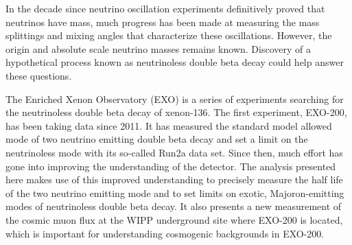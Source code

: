 In the decade since neutrino oscillation experiments definitively proved that neutrinos have mass, much progress has been made at measuring the mass splittings and mixing angles that characterize these oscillations. However, the origin and absolute scale neutrino masses remains known. Discovery of a hypothetical process known as neutrinoless double beta decay could help answer these questions.

The Enriched Xenon Observatory (EXO) is a series of experiments searching for the neutrinoless double beta decay of xenon-136. The first experiment, EXO-200, has been taking data since 2011. It has measured the standard model allowed mode of two neutrino emitting double beta decay and set a limit on the neutrinoless mode with its so-called Run2a data set. Since then, much effort has gone into improving the understanding of the detector. The analysis presented here makes use of this improved understanding to precisely measure the half life of the two neutrino emitting mode and to set limits on exotic, Majoron-emitting modes of neutrinoless double beta decay. It also presents a new measurement of the cosmic muon flux at the WIPP underground site where EXO-200 is located, which is important for understanding cosmogenic backgrounds in EXO-200.
